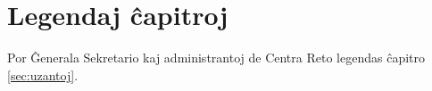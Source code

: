 \section{Legendaj ĉapitroj}
Por Ĝenerala Sekretario kaj administrantoj de Centra Reto legendas ĉapitro \ref{sec:uzantoj}.
